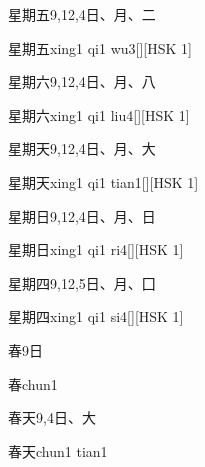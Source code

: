 \begin{Entry}{星期五}{9,12,4}{⽇、⽉、⼆}
  \begin{Phonetics}{星期五}{xing1 qi1 wu3}[][HSK 1]
  \end{Phonetics}
\end{Entry}

\begin{Entry}{星期六}{9,12,4}{⽇、⽉、⼋}
  \begin{Phonetics}{星期六}{xing1 qi1 liu4}[][HSK 1]
  \end{Phonetics}
\end{Entry}

\begin{Entry}{星期天}{9,12,4}{⽇、⽉、⼤}
  \begin{Phonetics}{星期天}{xing1 qi1 tian1}[][HSK 1]
  \end{Phonetics}
\end{Entry}

\begin{Entry}{星期日}{9,12,4}{⽇、⽉、⽇}
  \begin{Phonetics}{星期日}{xing1 qi1 ri4}[][HSK 1]
  \end{Phonetics}
\end{Entry}

\begin{Entry}{星期四}{9,12,5}{⽇、⽉、⼞}
  \begin{Phonetics}{星期四}{xing1 qi1 si4}[][HSK 1]
  \end{Phonetics}
\end{Entry}

\begin{Entry}{春}{9}{⽇}
  \begin{Phonetics}{春}{chun1}
  \end{Phonetics}
\end{Entry}

\begin{Entry}{春天}{9,4}{⽇、⼤}
  \begin{Phonetics}{春天}{chun1 tian1}
  \end{Phonetics}
\end{Entry}

